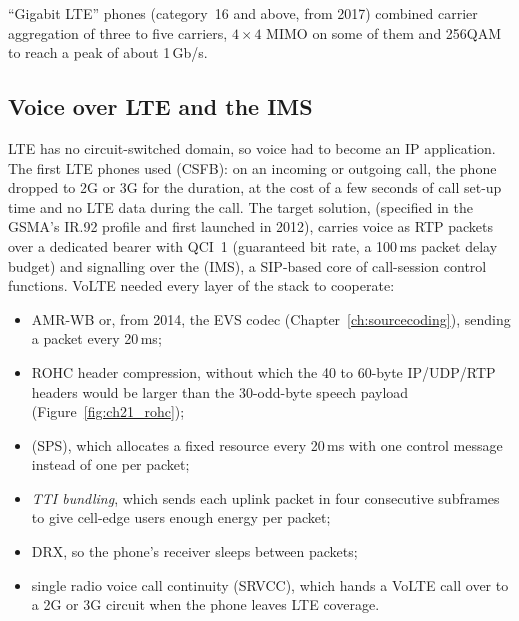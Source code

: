 ``Gigabit LTE'' phones (category~16 and above, from 2017) combined carrier aggregation of three to
five carriers, $4\times4$ MIMO on some of them and 256QAM to reach a peak of about 1\,Gb/s.


\subsection{Voice over LTE and the IMS}

LTE has no circuit-switched domain, so voice had to become an IP application. The first LTE phones
used  (CSFB): on an incoming or outgoing call, the phone dropped to 2G
or 3G for the duration, at the cost of a few seconds of call set-up time and no LTE data during the
call. The target solution,  (specified in the GSMA's IR.92 profile and first launched in
2012), carries voice as RTP packets over a dedicated bearer with QCI~1 (guaranteed bit rate, a 100\,ms
packet delay budget) and signalling over the  (IMS), a SIP-based core of
call-session control functions. VoLTE needed every layer of the stack to cooperate:
\begin{itemize}
\item AMR-WB or, from 2014, the EVS codec (Chapter~\ref{ch:sourcecoding}), sending a packet every
20\,ms;
\item ROHC header compression, without which the 40 to 60-byte IP/UDP/RTP headers would be larger
than the 30-odd-byte speech payload (Figure~\ref{fig:ch21_rohc});
\item {} (SPS), which allocates a fixed resource every 20\,ms with one
control message instead of one per packet;
\item \emph{TTI bundling}, which sends each uplink packet in four consecutive subframes to give
cell-edge users enough energy per packet;
\item DRX, so the phone's receiver sleeps between packets;
\item single radio voice call continuity (SRVCC), which hands a VoLTE call over to a 2G or 3G circuit
when the phone leaves LTE coverage.
\end{itemize}

